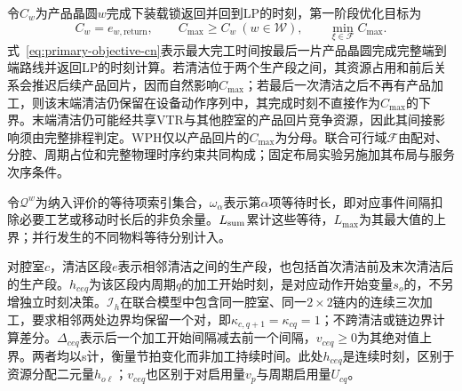 \documentclass[final,5p,times,twocolumn]{elsarticle}
\begin{document}
令$C_w$为产品晶圆$w$完成下装载锁返回并回到LP的时刻，第一阶段优化目标为
\begin{equation}
C_w=e_{w,\mathrm{return}},\qquad
C_{\max}\ge C_w\ (w\in\mathcal W),\qquad
\min_{\xi\in\mathcal F}C_{\max}.
\label{eq:primary-objective-cn}
\end{equation}
式~\eqref{eq:primary-objective-cn}表示最大完工时间按最后一片产品晶圆完成完整端到端路线并返回LP的时刻计算。若清洁位于两个生产段之间，其资源占用和前后关系会推迟后续产品回片，因而自然影响$C_{\max}$；若最后一次清洁之后不再有产品加工，则该末端清洁仍保留在设备动作序列中，其完成时刻不直接作为$C_{\max}$的下界。末端清洁仍可能经共享VTR与其他腔室的产品回片竞争资源，因此其间接影响须由完整排程判定。WPH仅以产品回片的$C_{\max}$为分母。联合可行域$\mathcal F$由配对、分腔、周期占位和完整物理时序约束共同构成；固定布局实验另施加其布局与服务次序条件。

令$\mathcal Q^w$为纳入评价的等待项索引集合，$\omega_\alpha$表示第$\alpha$项等待时长，即对应事件间隔扣除必要工艺或移动时长后的非负余量。$L_{\rm sum}$累计这些等待，$L_{\max}$为其最大值的上界；并行发生的不同物料等待分别计入。

对腔室$c$，清洁区段$e$表示相邻清洁之间的生产段，也包括首次清洁前及末次清洁后的生产段。$h_{ceq}$为该区段内周期$q$的加工开始时刻，是对应动作开始变量$s_o$的，不另增独立时刻决策。$\mathcal I_h$在联合模型中包含同一腔室、同一$2\times2$链内的连续三次加工，要求相邻两处边界均保留一个对，即$\kappa_{c,q+1}=\kappa_{cq}=1$；不跨清洁或链边界计算差分。$\Delta_{ceq}$表示后一个加工开始间隔减去前一个间隔，$v_{ceq}\ge0$为其绝对值上界。两者均以s计，衡量节拍变化而非加工持续时间。此处$h_{ceq}$是连续时刻，区别于资源分配二元量$h_{o\ell}$；$v_{ceq}$也区别于对启用量$v_p$与周期启用量$U_{cq}$。
\end{document}

